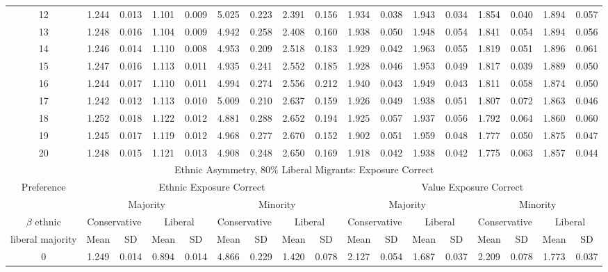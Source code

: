 \documentclass{article}
\begin{document}
\begin{table}[H]
{\begin{tabular}{|c|c|c|c|c|c|c|c|c|c|c|c|c|c|c|c|c|}
    12 & 1.244 & 0.013 & 1.101 & 0.009 & 5.025 & 0.223 & 2.391 & 0.156 & 1.934 & 0.038 & 1.943 & 0.034 & 1.854 & 0.040 & 1.894 & 0.057 \\ 
    13 & 1.248 & 0.016 & 1.104 & 0.009 & 4.942 & 0.258 & 2.408 & 0.160 & 1.938 & 0.050 & 1.948 & 0.054 & 1.841 & 0.054 & 1.894 & 0.056 \\ 
    14 & 1.246 & 0.014 & 1.110 & 0.008 & 4.953 & 0.209 & 2.518 & 0.183 & 1.929 & 0.042 & 1.963 & 0.055 & 1.819 & 0.051 & 1.896 & 0.061 \\ 
    15 & 1.247 & 0.016 & 1.113 & 0.011 & 4.935 & 0.241 & 2.552 & 0.185 & 1.928 & 0.046 & 1.953 & 0.049 & 1.817 & 0.039 & 1.889 & 0.050 \\ 
    16 & 1.244 & 0.017 & 1.110 & 0.011 & 4.994 & 0.274 & 2.556 & 0.212 & 1.940 & 0.043 & 1.949 & 0.043 & 1.811 & 0.058 & 1.874 & 0.050 \\ 
    17 & 1.242 & 0.012 & 1.113 & 0.010 & 5.009 & 0.210 & 2.637 & 0.159 & 1.926 & 0.049 & 1.938 & 0.051 & 1.807 & 0.072 & 1.863 & 0.046 \\ 
    18 & 1.252 & 0.018 & 1.122 & 0.012 & 4.881 & 0.288 & 2.652 & 0.194 & 1.925 & 0.057 & 1.937 & 0.056 & 1.792 & 0.064 & 1.860 & 0.060 \\ 
    19 & 1.245 & 0.017 & 1.119 & 0.012 & 4.968 & 0.277 & 2.670 & 0.152 & 1.902 & 0.051 & 1.959 & 0.048 & 1.777 & 0.050 & 1.875 & 0.047 \\ 
    20 & 1.248 & 0.015 & 1.121 & 0.013 & 4.908 & 0.248 & 2.650 & 0.169 & 1.918 & 0.042 & 1.938 & 0.042 & 1.775 & 0.063 & 1.857 & 0.044 \\ 
   \hline
     \multicolumn{17}{|c|}{Ethnic Asymmetry, $80 \%$ Liberal Migrants: Exposure Correct}  \\\hline
 Preference &  \multicolumn{8}{|c|}{Ethnic Exposure Correct} & \multicolumn{8}{|c|}{Value Exposure Correct}   \\\hline
 & \multicolumn{4}{|c|}{Majority} & \multicolumn{4}{|c|}{Minority}  & \multicolumn{4}{|c|}{Majority} & \multicolumn{4}{|c|}{Minority}  \\
 $\beta$ ethnic & \multicolumn{2}{|c|}{Conservative} & \multicolumn{2}{|c|}{Liberal} 
& \multicolumn{2}{|c|}{Conservative} & \multicolumn{2}{|c|}{Liberal} & \multicolumn{2}{|c|}{Conservative} & \multicolumn{2}{|c|}{Liberal} 
& \multicolumn{2}{|c|}{Conservative} & \multicolumn{2}{|c|}{Liberal}\\
 liberal majority & Mean & SD & Mean & SD & Mean & SD & Mean & SD & Mean & SD & Mean & SD & Mean & SD & Mean & SD\\
 \hline
   0 & 1.249 & 0.014 & 0.894 & 0.014 & 4.866 & 0.229 & 1.420 & 0.078 & 2.127 & 0.054 & 1.687 & 0.037 & 2.209 & 0.078 & 1.773 & 0.037 \\ 

\end{tabular}}
\end{table}
\end{document}
